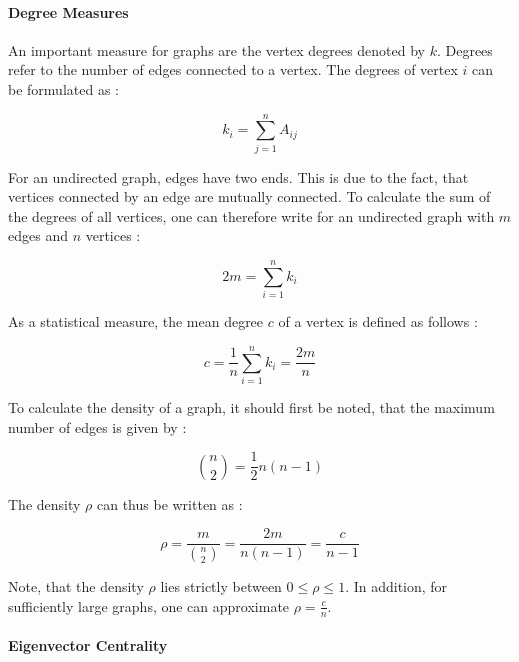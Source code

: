 	\paragraph{Degree Measures} \mbox{}

	\noindent An important measure for graphs are the vertex degrees denoted by 
	$k$. Degrees refer to the number of edges connected to a vertex. The 
	degrees of vertex $i$ can be formulated as \citep[p. 133]{Newman2010}:

	\begin{equation}
		k_i = \sum_{j=1}^{n} A_{ij}
	\end{equation}

	\noindent For an undirected graph, edges have two ends. This is due to the 
	fact, that vertices connected by an edge are mutually connected. To
	calculate the sum of the degrees of all vertices, one can therefore write 
	for an undirected graph with $m$ edges and $n$ vertices 
	\citep[p. 133]{Newman2010}:

	\begin{equation}
		2m = \sum_{i=1}^{n} k_i	
	\end{equation}

	\noindent As a statistical measure, the mean degree $c$ of a vertex is 
	defined as follows \citep[p. 134]{Newman2010}:

	\begin{equation}
		c = \frac{1}{n}\sum_{i=1}^{n}k_i = \frac{2m}{n}
	\end{equation}

	\noindent To calculate the density of a graph, it should first be noted, 
	that the maximum number of edges is given by \citep[p. 134]{Newman2010}:

	\begin{equation}
		{n \choose 2} = \frac{1}{2}n(n-1)
	\end{equation}

	\noindent The density $\rho$ can thus be written as \citep[p. 134]{Newman2010}:

	\begin{equation}
		\rho = \frac{m}{{n \choose 2}} = \frac{2m}{n(n-1)} = \frac{c}{n-1}
	\end{equation}

	\noindent Note, that the density $\rho$ lies strictly between 
	$0 \leqslant \rho \leqslant 1$. In addition, for sufficiently large graphs,
	one can approximate $\rho = \frac{c}{n}$. 

	\paragraph{Eigenvector Centrality} \mbox{}

